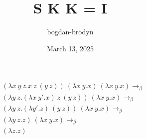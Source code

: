 \documentclass{article}
\title{S K K = I}
\author{bogdan-brodyn}
\date{March 13, 2025}
\begin{document}
\maketitle
\thispagestyle{empty}

\begin{align}
&(\lambda x\ y\ z.x\ z\ (y\ z))\ (\lambda x\ y.x)\ (\lambda x\ y.x) \rightarrow_\beta \\
&(\lambda y\ z.(\lambda x\ y'.x)\ z\ (y\ z))\ (\lambda x\ y.x) \rightarrow_\beta \\
&(\lambda y\ z.(\lambda y'.z)\ (y\ z))\ (\lambda x\ y.x) \rightarrow_\beta \\
&(\lambda y\ z.z)\ (\lambda x\ y.x) \rightarrow_\beta \\
&(\lambda z.z)
\end{align}
\end{document}
